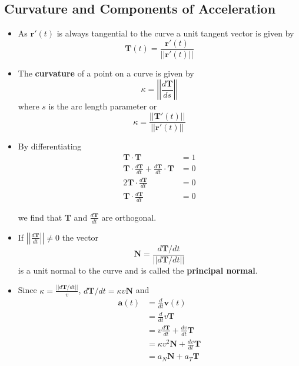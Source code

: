 \documentclass{article}
\begin{document}
\setcounter{subsection}{2}
\subsection{Curvature and Components of Acceleration}

\begin{itemize}
  \item As $\mathbf{r}'(t)$ is always tangential to the curve a unit tangent vector is given by \[\mathbf{T}(t) = \frac{\mathbf{r}'(t)}{||\mathbf{r}'(t)||}\]

  \item The \textbf{curvature} of a point on a curve is given by \[\kappa = \left|\left|\frac{d \mathbf{T}}{ds}\right|\right|\] where $s$ is the arc length parameter or \[\kappa = \frac{||\mathbf{T}'(t)||}{||\mathbf{r}'(t)||}\]

  \item By differentiating \begin{align*}
          \mathbf{T} \cdot \mathbf{T}                                                           & = 1 \\
          \mathbf{T} \cdot \frac{d \mathbf{T}}{d t} + \frac{d \mathbf{T}}{d t} \cdot \mathbf{T} & = 0 \\
          2 \mathbf{T} \cdot \frac{d \mathbf{T}}{d t}                                           & = 0 \\
          \mathbf{T} \cdot \frac{d \mathbf{T}}{d t}                                             & = 0
        \end{align*}

        we find that $\mathbf{T}$ and $\frac{d \mathbf{T}}{d t}$ are orthogonal.

  \item If $\left|\left|\frac{d \mathbf{T}}{d t}\right|\right| \ne 0$ the vector \[\mathbf{N} = \frac{d \mathbf{T} / d t}{||d \mathbf{T} / d t||}\] is a unit normal to the curve and is called the \textbf{principal normal}.

  \item Since $\kappa = \frac{||d \mathbf{T} / d t||}{v}$, $d \mathbf{T} / d t = \kappa v \mathbf{N}$ and \begin{align*}
          \mathbf{a}(t) & = \frac{d}{d t} \mathbf{v}(t)                             \\
                        & = \frac{d}{d t} v \mathbf{T}                              \\
                        & = v \frac{d \mathbf{T}}{d t} + \frac{d v}{d t} \mathbf{T} \\
                        & = \kappa v^2 \mathbf{N} + \frac{d v}{d t} \mathbf{T}      \\
                        & = a_N \mathbf{N} + a_T \mathbf{T}
        \end{align*}


\end{itemize}
\end{document}
